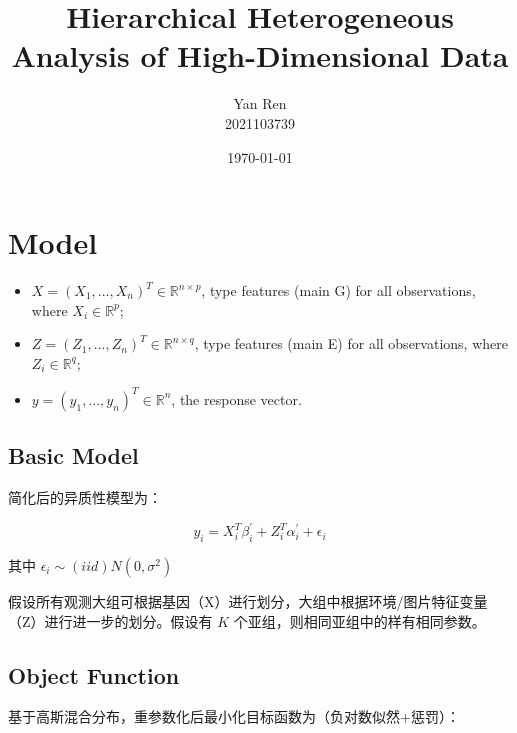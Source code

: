 \documentclass[12pt, a4paper, oneside]{article}
\title{\textbf{Hierarchical Heterogeneous Analysis of High-Dimensional Data}}
\author{Yan Ren \\ 2021103739}
\date{\today}
\numberwithin{equation}{section}
\begin{document}
	
\maketitle
\newpage
\tableofcontents
\newpage

\section{Model}

\begin{itemize}
	\item $X = (X_1,...,X_n)^{T} \in \mathbb{R}^{n\times p}$, type \uppercase\expandafter{} features (main G) for all observations, where $X_i \in \mathbb{R}^{p}$;
	\item $Z = (Z_1,...,Z_n)^{T} \in \mathbb{R}^{n\times q}$, type \uppercase\expandafter{} features (main E) for all observations, where $Z_i \in \mathbb{R}^{q}$;
	\item $y = (y_1,...,y_n)^{T} \in \mathbb{R}^{n}$, the response vector.
\end{itemize}

\subsection{Basic Model}

简化后的异质性模型为：

\begin{equation}
	y_i = X_i^T \beta_i^\prime + Z_i^T\alpha_i^\prime + \epsilon_i
	\label{eq:model}
\end{equation}

其中 $\epsilon_i \sim (iid) N(0, \sigma^2)$

假设所有观测大组可根据基因（X）进行划分，大组中根据环境/图片特征变量（Z）进行进一步的划分。假设有 $K$ 个亚组，则相同亚组中的样有相同参数。

\subsection{Object Function}

基于高斯混合分布，重参数化后最小化目标函数为（负对数似然+惩罚）：
\end{document}
